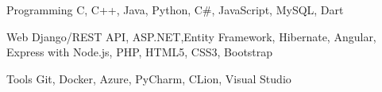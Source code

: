 
\begin{cvskills}
  \cvskill
    {Programming} %
    { C, C++,  Java, Python, C\#, JavaScript, MySQL, Dart} %

  \cvskill
    {Web} %
    {Django/REST API, ASP.NET,Entity Framework, Hibernate, Angular, Express with Node.js, PHP, HTML5, CSS3, Bootstrap} %
   
   \cvskill
    {Tools} %
    {Git, Docker, Azure, PyCharm, CLion, Visual Studio} %
    
\end{cvskills}
